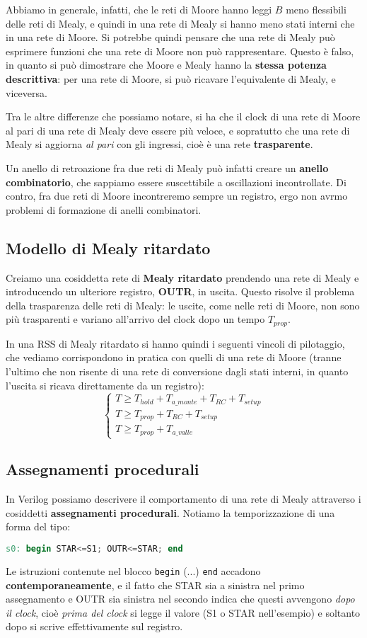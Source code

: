 \documentclass[a4paper,11pt]{article}
\begin{document}
Abbiamo in generale, infatti, che le reti di Moore hanno leggi $B$ meno flessibili delle reti di Mealy, e quindi in una rete di Mealy si hanno meno stati interni che in una rete di Moore.
Si potrebbe quindi pensare che una rete di Mealy può esprimere funzioni che una rete di Moore non può rappresentare.
Questo è falso, in quanto si può dimostrare che Moore e Mealy hanno la \textbf{stessa potenza descrittiva}: per una rete di Moore, si può ricavare l'equivalente di Mealy, e viceversa.

Tra le altre differenze che possiamo notare, si ha che il clock di una rete di Moore al pari di una rete di Mealy deve essere più veloce, e sopratutto che una rete di Mealy si aggiorna \textit{al pari} con gli ingressi, cioè è una rete \textbf{trasparente}.

Un anello di retroazione fra due reti di Mealy può infatti creare un \textbf{anello combinatorio}, che sappiamo essere suscettibile a oscillazioni incontrollate.
Di contro, fra due reti di Moore incontreremo sempre un registro, ergo non avrmo problemi di formazione di anelli combinatori.

\subsection{Modello di Mealy ritardato}
Creiamo una cosiddetta rete di \textbf{Mealy ritardato} prendendo una rete di Mealy e introducendo un ulteriore registro, \textbf{OUTR}, in uscita.
Questo risolve il problema della trasparenza delle reti di Mealy: le uscite, come nelle reti di Moore, non sono più trasparenti e variano all'arrivo del clock dopo un tempo $T_{prop}$.

In una RSS di Mealy ritardato si hanno quindi i seguenti vincoli di pilotaggio, che vediamo corrispondono in pratica con quelli di una rete di Moore (tranne l'ultimo che non risente di una rete di conversione dagli stati interni, in quanto l'uscita si ricava direttamente da un registro):
\[
	\begin{cases}
		T \geq T_{hold} + T_{a\_monte} + T_{RC} + T_{setup} \\ 
		T \geq T_{prop} + T_{RC} + T_{setup} \\ 
		T \geq T_{prop} + T_{a\_valle}
	\end{cases}
\]

\subsection{Assegnamenti procedurali}
In Verilog possiamo descrivere il comportamento di una rete di Mealy attraverso i cosiddetti \textbf{assegnamenti procedurali}.
Notiamo la temporizzazione di una forma del tipo:
\begin{lstlisting}[language=verilog, style=codestyle]	
s0: begin STAR<=S1; OUTR<=STAR; end
\end{lstlisting}
Le istruzioni contenute nel blocco \lstinline|begin| (...) \lstinline|end| accadono \textbf{contemporaneamente}, e il fatto che STAR sia a sinistra nel primo assegnamento e OUTR sia sinistra nel secondo indica che questi avvengono \textit{dopo il clock}, cioè \textit{prima del clock} si legge il valore (S1 o STAR nell'esempio) e soltanto dopo si scrive effettivamente sul registro.
\end{document}
